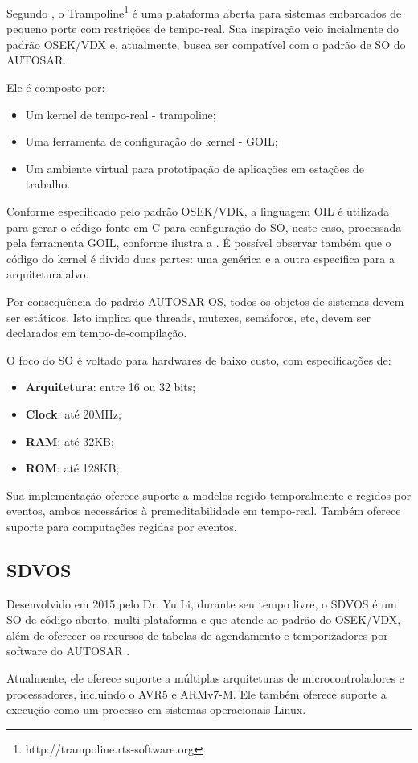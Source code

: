 Segundo , o Trampoline\footnote{http://trampoline.rts-software.org} é uma plataforma aberta para sistemas embarcados de pequeno porte com restrições de tempo-real. Sua inspiração veio incialmente do padrão OSEK/VDX e, atualmente, busca ser compatível com o padrão de SO do AUTOSAR.

Ele é composto por:
\begin{itemize}
	\item Um kernel de tempo-real - trampoline;
	\item Uma ferramenta de configuração do kernel - GOIL;
	\item Um ambiente virtual para prototipação de aplicações em estações de trabalho.
\end{itemize}

Conforme especificado pelo padrão OSEK/VDK, a linguagem OIL é utilizada para gerar o código fonte em C para configuração do SO, neste caso, processada pela ferramenta GOIL, conforme ilustra a . É possível observar também que o código do kernel é divido duas partes: uma genérica e a outra específica para a arquitetura alvo.


Por consequência do padrão AUTOSAR OS, todos os objetos de sistemas devem ser estáticos. Isto implica que threads, mutexes, semáforos, etc, devem ser declarados em tempo-de-compilação.

O foco do SO é voltado para hardwares de baixo custo, com especificações de:
\begin{itemize}
	\item \textbf{Arquitetura}: entre 16 ou 32 bits;
	\item \textbf{Clock}: até 20MHz;
	\item \textbf{RAM}: até 32KB;
	\item \textbf{ROM}:	até 128KB;	
\end{itemize}

Sua implementação oferece suporte a modelos regido temporalmente e regidos por eventos, ambos necessários à premeditabilidade em tempo-real. Também oferece suporte para computações regidas por eventos.

\subsection{SDVOS}

Desenvolvido em 2015 pelo Dr. Yu Li, durante seu tempo livre, o SDVOS é um SO de código aberto, multi-plataforma e que atende ao padrão do OSEK/VDX, além de oferecer os recursos de tabelas de agendamento e temporizadores por software do AUTOSAR \cite{sdvos}.

Atualmente, ele oferece suporte a múltiplas arquiteturas de microcontroladores e processadores, incluindo o AVR5 e ARMv7-M. Ele também oferece suporte a execução como um processo em sistemas operacionais Linux.